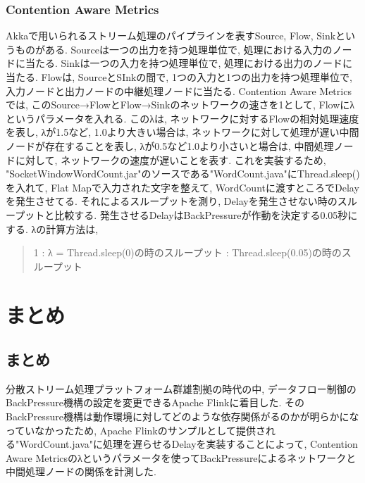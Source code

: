 \documentclass[11pt]{jreport}
\begin{document}
\subsection{Contention Aware Metrics}
Akkaで用いられるストリーム処理のパイプラインを表すSource, Flow, Sinkというものがある. 
Sourceは一つの出力を持つ処理単位で, 処理における入力のノードに当たる. 
Sinkは一つの入力を持つ処理単位で, 処理における出力のノードに当たる.
Flowは, SourceとSInkの間で, 1つの入力と1つの出力を持つ処理単位で, 入力ノードと出力ノードの中継処理ノードに当たる. 
Contention Aware Metrics\cite{cam}では, このSource→FlowとFlow→Sinkのネットワークの速さを1として, Flowにλというパラメータを入れる.
このλは, ネットワークに対するFlowの相対処理速度を表し, 
λが1.5など, 1.0より大きい場合は, ネットワークに対して処理が遅い中間ノードが存在することを表し, 
λが0.5など1.0より小さいと場合は, 中間処理ノードに対して, ネットワークの速度が遅いことを表す. 
これを実装するため, "SocketWindowWordCount.jar"のソースである"WordCount.java"にThread.sleep()を入れて, 
Flat Mapで入力された文字を整えて, WordCountに渡すところでDelayを発生させてる. それによるスループットを測り, 
Delayを発生させない時のスループットと比較する. 発生させるDelayはBackPressureが作動を決定する0.05秒にする.
λの計算方法は, 
\begin{quote}
 1 : λ = Thread.sleep(0)の時のスループット : Thread.sleep(0.05)の時のスループット
\end{quote}

%
% 

\chapter{まとめ}
\section{まとめ}
分散ストリーム処理プラットフォーム群雄割拠の時代の中, データフロー制御のBackPressure機構の設定を変更できるApache Flinkに着目した. 
そのBackPressure機構は動作環境に対してどのような依存関係がるのかが明らかになっていなかったため, 
Apache Flinkのサンプルとして提供される"WordCount.java"に処理を遅らせるDelayを実装することによって, 
Contention Aware Metricsのλというパラメータを使ってBackPressureによるネットワークと中間処理ノードの関係を計測した.
\end{document}
